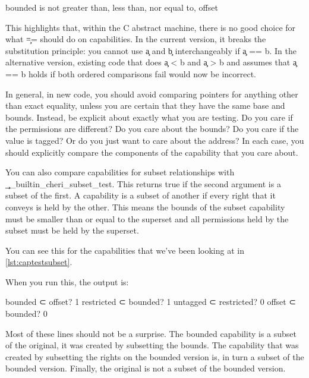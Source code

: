 {{{{{{{{\begin{console}
bounded is not greater than, less than, nor equal to, offset
\end{console}

This highlights that, within the C abstract machine, there is no good choice for what \c{==} should do on capabilities.
In the current version, it breaks the substitution principle: you cannot use \c{a} and \c{b} interchangeably if \c{a == b}.
In the alternative version, existing code that does \c{a < b} and \c{a > b} and assumes that \c{a == b} holds if both ordered comparisons fail would now be incorrect.

In general, in new code, you should avoid comparing pointers for anything other than exact equality, unless you are certain that they have the same base and bounds.
Instead, be explicit about exactly what you are testing.
Do you care if the permissions are different?
Do you care about the bounds?
Do you care if the value is tagged?
Or do you just want to care about the address?
In each case, you should explicitly compare the components of the capability that you care about.

You can also compare capabilities for subset relationships with \c{__builtin_cheri_subset_test}.
This returns true if the second argument is a subset of the first.
A capability is a subset of another if every right that it conveys is held by the other.
This means the bounds of the subset capability must be smaller than or equal to the superset and all permissions held by the subset must be held by the superset.

You can see this for the capabilities that we've been looking at in \ref{lst:captestsubset}.

\codelisting[filename=examples/compare_capabilities/example.c,marker=capability_subset,label=lst:captestsubset,caption="Subset relationships over two capabilities."]{}

When you run this, the output is:

\begin{console}
bounded ⊂ offset? 1
restricted ⊂ bounded? 1
untagged ⊂ restricted? 0
offset ⊂ bounded? 0
\end{console}

Most of these lines should not be a surprise.
The bounded capability is a subset of the original, it was created by subsetting the bounds.
The capability that was created by subsetting the rights on the bounded version is, in turn a subset of the bounded version.
Finally, the original is not a subset of the bounded version.

}}}}}}}}
